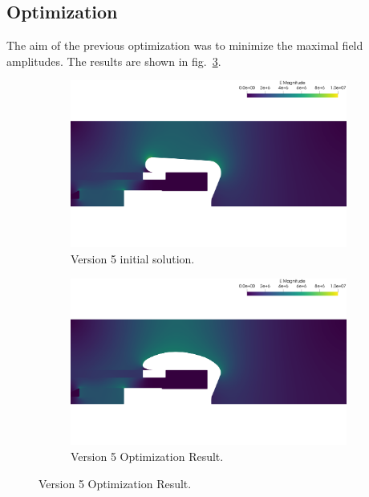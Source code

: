 \subsection{Optimization}
The aim of the previous optimization was to minimize the maximal field amplitudes. The results are shown in fig.~\ref{fig:v5_opt}.

\begin{center}
\begin{figure}[H]
   \begin{subfigure}{0.45\textwidth}
      \includegraphics[width=\textwidth]{fig/v5_init}
      \caption{Version 5 initial solution.}
      \label{fig:v5_init}
   \end{subfigure}
   \begin{subfigure}{0.45\textwidth}
      \includegraphics[width=\textwidth]{fig/v5_opt}
      \caption{Version 5 Optimization Result.}
      \label{fig:v5_opt}
   \end{subfigure}
\end{figure}
\end{center}

